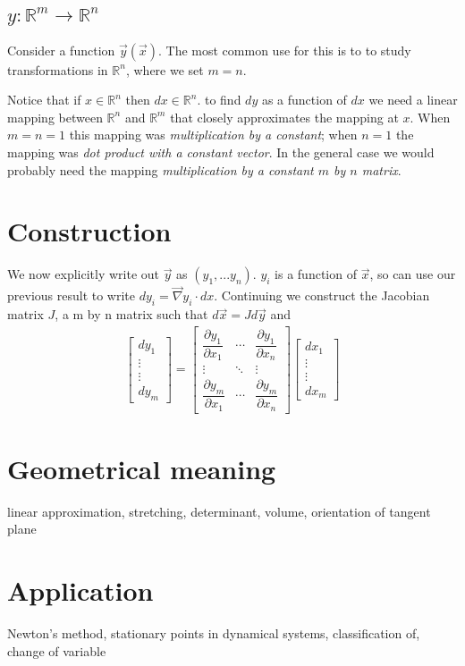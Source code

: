 \documentclass{article}
\begin{document}
\subsection{$y: \mathbb{R}^m \rightarrow \mathbb{R}^n$}

Consider a function $\vec{y}(\vec{x})$. The most common use for this is to to study transformations in $\mathbb{R}^n$, where we set $m=n$. 

Notice that if $x \in \mathbb{R}^n$ then $dx \in \mathbb{R}^n$. to find $dy$ as a function of $dx$ we need a linear mapping between {$\mathbb{R}^n$ and $\mathbb{R}^m$} that closely approximates the mapping at $x$. When $m=n=1$ this mapping was \emph{multiplication by a constant}; when $n=1$ the mapping was \emph{dot product with a constant vector}. In the general case we would probably need the mapping \emph{multiplication by a constant $m$ by $n$ matrix}.

\section{Construction}

We now explicitly write out $\vec{y}$ as $(y_1, ... y_n)$. $y_i$ is a function of $\vec{x}$, so can use our previous result to write $dy_i = \vec\nabla y_i \cdot dx$. Continuing we construct the Jacobian matrix $J$, a m by n matrix such that $d\vec{x} = J d\vec{y}$ and 
\begin{align}
\begin{bmatrix} dy_1 \\ \vdots \\ \vdots \\ dy_m \end{bmatrix} 
=
\begin{bmatrix} \dfrac{\partial y_1}{\partial x_1} & \cdots & \dfrac{\partial y_1}{\partial x_n} \\ \vdots & \ddots & \vdots \\ \dfrac{\partial y_m}{\partial x_1} & \cdots & \dfrac{\partial y_m}{\partial x_n}  \end{bmatrix}
\begin{bmatrix} dx_1 \\ \vdots \\ \vdots \\ dx_m \end{bmatrix} 
\end{align}

\section{Geometrical meaning}

linear approximation, stretching, determinant, volume, orientation of tangent plane

\section{Application}

Newton's method, stationary points in dynamical systems, classification of, change of variable
\end{document}
